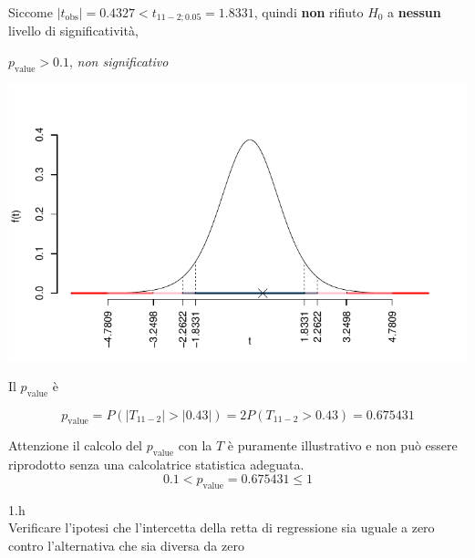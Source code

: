 \documentclass[
  11pt,
]{book}
\theoremstyle{mytheoremstyle}
\theoremstyle{mydefstyle}
\newenvironment{sol}
  {
  \begin{tcolorbox}[enhanced,breakable,arc=0.1mm,boxrule=1pt,colback=white,colframe=iblue,
  title=\bf \fontfamily{lmss}\selectfont \hspace{.5 cm} Soluzione,drop fuzzy shadow]

}{
\end{tcolorbox}
  }
\begin{document}
\begin{sol}
Siccome \(|t_\text{obs}|=0.4327<t_{11-2;0.05}=1.8331\), quindi \textbf{non} rifiuto \(H_0\) a \textbf{nessun} livello di significatività,

\(p_\text{value}>0.1\), \emph{non significativo}

\begin{center}\includegraphics{Esami_passati_con_soluzioni_files/figure-latex/06-regr-13,-1} \end{center}

Il \(p_{\text{value}}\) è

\[ p_{\text{value}} = P(|T_{11-2}|>|0.43|)=2P(T_{11-2}>0.43)=0.675431 \]

Attenzione il calcolo del \(p_\text{value}\) con la \(T\) è puramente illustrativo e non può essere riprodotto senza una calcolatrice statistica adeguata.\[
 0.1 < p_\text{value}= 0.675431 \leq 1 
\]

\end{sol}

1.h\\
Verificare l'ipotesi che l'intercetta della retta di
regressione sia uguale a zero contro l'alternativa che sia
diversa da zero
\end{document}
